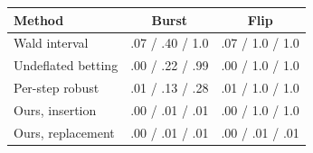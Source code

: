 \begin{tabular}{lcc}
\toprule
Method & Burst & Flip \\
\midrule
Wald interval & .07 / .40 / 1.0 & .07 / 1.0 / 1.0 \\
Undeflated betting & .00 / .22 / .99 & .00 / 1.0 / 1.0 \\
Per-step robust & .01 / .13 / .28 & .01 / 1.0 / 1.0 \\
Ours, insertion & .00 / .01 / .01 & .00 / 1.0 / 1.0 \\
Ours, replacement & .00 / .01 / .01 & .00 / .01 / .01 \\
\bottomrule
\end{tabular}